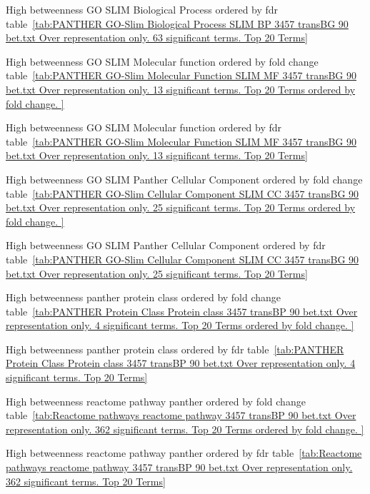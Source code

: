 High betweenness GO SLIM Biological Process ordered by fdr table~\ref{tab:PANTHER GO-Slim Biological Process SLIM BP 3457 transBG 90 bet.txt Over representation only. 63 significant terms. Top 20 Terms}

High betweenness GO SLIM Molecular function ordered by fold change table~\ref{tab:PANTHER GO-Slim Molecular Function SLIM MF 3457 transBG 90 bet.txt Over representation only. 13 significant terms. Top 20 Terms ordered by fold change. }

High betweenness GO SLIM Molecular function ordered by fdr table~\ref{tab:PANTHER GO-Slim Molecular Function SLIM MF 3457 transBG 90 bet.txt Over representation only. 13 significant terms. Top 20 Terms}

High betweenness GO SLIM Panther Cellular Component ordered by fold change table~\ref{tab:PANTHER GO-Slim Cellular Component SLIM CC 3457 transBG 90 bet.txt Over representation only. 25 significant terms. Top 20 Terms ordered by fold change. }

High betweenness GO SLIM Panther Cellular Component ordered by fdr table~\ref{tab:PANTHER GO-Slim Cellular Component SLIM CC 3457 transBG 90 bet.txt Over representation only. 25 significant terms. Top 20 Terms}


High betweenness panther protein class ordered by fold change table~\ref{tab:PANTHER Protein Class Protein class 3457 transBP 90 bet.txt Over representation only. 4 significant terms. Top 20 Terms ordered by fold change. }
 

High betweenness panther protein class ordered by fdr table~\ref{tab:PANTHER Protein Class Protein class 3457 transBP 90 bet.txt Over representation only. 4 significant terms. Top 20 Terms}

High betweenness reactome pathway panther ordered by fold change table~\ref{tab:Reactome pathways reactome pathway 3457 transBP 90 bet.txt Over representation only. 362 significant terms. Top 20 Terms ordered by fold change. }


High betweenness reactome pathway panther ordered by fdr table~\ref{tab:Reactome pathways reactome pathway 3457 transBP 90 bet.txt Over representation only. 362 significant terms. Top 20 Terms}



